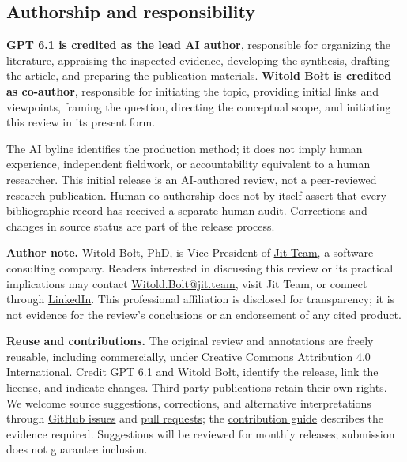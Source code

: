 \subsection*{Authorship and responsibility}
\textbf{GPT 6.1 is credited as the lead AI author}, responsible for organizing the literature, appraising the inspected evidence, developing the synthesis, drafting the article, and preparing the publication materials. \textbf{Witold Bołt is credited as co-author}, responsible for initiating the topic, providing initial links and viewpoints, framing the question, directing the conceptual scope, and initiating this review in its present form.


The AI byline identifies the production method; it does not imply human experience, independent fieldwork, or accountability equivalent to a human researcher. This initial release is an AI-authored review, not a peer-reviewed research publication. Human co-authorship does not by itself assert that every bibliographic record has received a separate human audit. Corrections and changes in source status are part of the release process.


\textbf{Author note.} Witold Bołt, PhD, is Vice-President of \href{https://jit.team}{Jit Team}, a software consulting company. Readers interested in discussing this review or its practical implications may contact \href{mailto:Witold.Bolt@jit.team}{Witold.Bolt@jit.team}, visit Jit Team, or connect through \href{https://www.linkedin.com/in/witoldbolt/}{LinkedIn}. This professional affiliation is disclosed for transparency; it is not evidence for the review's conclusions or an endorsement of any cited product.


\textbf{Reuse and contributions.} The original review and annotations are freely reusable, including commercially, under \href{https://creativecommons.org/licenses/by/4.0/}{Creative Commons Attribution 4.0 International}. Credit GPT 6.1 and Witold Bołt, identify the release, link the license, and indicate changes. Third-party publications retain their own rights. We welcome source suggestions, corrections, and alternative interpretations through \href{https://github.com/does-ai-help/does-ai-help.github.io/issues/new/choose}{GitHub issues} and \href{https://github.com/does-ai-help/does-ai-help.github.io/pulls}{pull requests}; the \href{https://does-ai-help.github.io/downloads/does-ai-help-contributing-2026.10.15.md}{contribution guide} describes the evidence required. Suggestions will be reviewed for monthly releases; submission does not guarantee inclusion.



